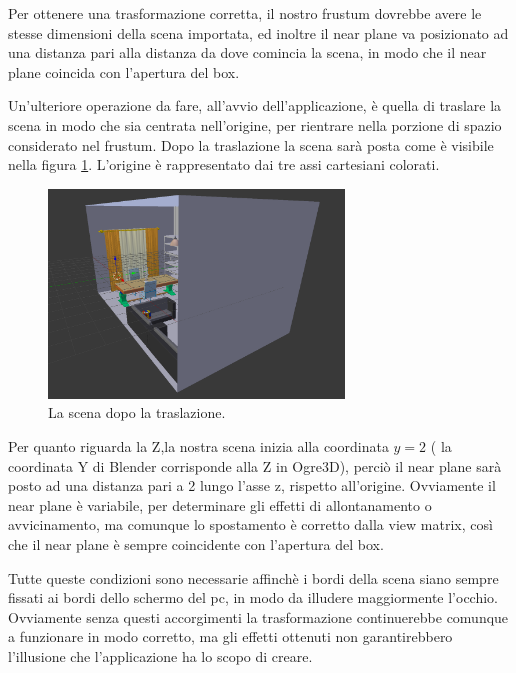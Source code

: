 Per ottenere una trasformazione corretta, il nostro frustum dovrebbe avere le stesse dimensioni della scena importata, ed inoltre il near plane va posizionato ad una distanza pari alla distanza da dove comincia la scena, in modo che il near plane coincida con l'apertura del box.

Un'ulteriore operazione da fare, all'avvio dell'applicazione, è quella di traslare la scena in modo che sia centrata nell'origine, per rientrare nella porzione di spazio considerato nel frustum.
Dopo la traslazione la scena sarà posta come è visibile nella figura \ref{transl-liv-room}. L'origine è rappresentato dai tre assi cartesiani colorati.

\begin{figure}[htbp]
\centering
\includegraphics[width=0.7\textwidth]{images/progetto/living-room-translated.png}
\caption{La scena dopo la traslazione.\label{transl-liv-room}}
\end{figure}


Per quanto riguarda la Z,la nostra scena inizia alla coordinata $y=2$ ( la coordinata Y di Blender corrisponde alla Z in Ogre3D), perciò il near plane sarà posto ad una distanza pari a 2 lungo l'asse z, rispetto all'origine. Ovviamente il near plane è variabile, per determinare gli effetti di allontanamento o avvicinamento, ma comunque lo spostamento è corretto dalla view matrix, così che il near plane è sempre coincidente con l'apertura del box.

Tutte queste condizioni sono necessarie affinchè i bordi della scena siano sempre fissati ai bordi dello schermo del pc, in modo da illudere maggiormente l'occhio. Ovviamente senza questi accorgimenti la trasformazione continuerebbe comunque a funzionare in modo corretto, ma gli effetti ottenuti non garantirebbero l'illusione che l'applicazione ha lo scopo di creare.
 

